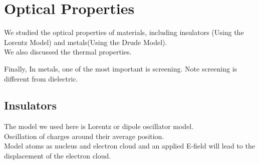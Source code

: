 \documentclass[12pt,a4paper]{article}
\title{\topic}
\begin{document}
\begin{titlepage}
    \maketitle
\end{titlepage}

\tableofcontents

\newpage

\begin{abstract}
\noindent
Abstract of this course
\end{abstract}

\section{Optical Properties}
We studied the optical properties of materials, including insulators (Using the Lorentz Model) and metals(Using the Drude Model).\\



We also discussed the thermal properties.

Finally, In metals, one of the most important is screening. Note screening is different from dielectric.
\subsection{Insulators}
    The model we used here is Lorentz or dipole oscillator model.\\
    \indent Oscillation of charges around their average position.\\
    \indent Model atoms as nucleus and electron cloud and an applied E-field will lead to the displacement of the electron cloud.\\
\end{document}
